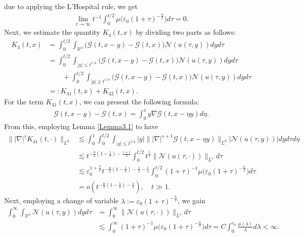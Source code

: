 \documentclass[11pt,reqno]{amsart}
\begin{document}
due to applying the L'Hospital rule, we get
\begin{align*}
    \lim_{t \to \infty} t^{-1} \int_0^{t/2} \mu\big(\varepsilon_0 (1+\tau)^{-\frac{n}{2}} \big) d\tau = 0.
\end{align*}
Next, we estimate the quantity $K_4(t,x)$ by dividing two parts as follows:
\begin{align*}
    K_4(t,x) &= \int_0^{t/2} \int_{\mathbb{R}^n} \big(\mathcal{G}(t, x-y)-\mathcal{G}(t,x)\big)\mathcal{N}(u(\tau,y)) dy d\tau \\
    &= \int_0^{t/2} \int_{|y| \leq t^{1/4}} \big(\mathcal{G}(t, x-y)-\mathcal{G}(t,x)\big)\mathcal{N}(u(\tau,y)) dy d\tau\\
    &\qquad + \int_0^{t/2} \int_{|y| \geq t^{1/4}} \big(\mathcal{G}(t, x-y)-\mathcal{G}(t,x)\big)\mathcal{N}(u(\tau,y)) dy d\tau\\
    & =: K_{41}(t,x) + K_{42}(t,x).
\end{align*}
For the term $K_{41}(t,x)$, we can present the following formula:
\begin{align*}
    \mathcal{G}(t, x-y) - \mathcal{G}(t,x) = \int_0^1 y\nabla \mathcal{G}(t,x-\eta y) d\eta.
\end{align*}
From this, employing Lemma \ref{Lemma3.1} to have
\begin{align*}
    \||\nabla|^s K_{41}(t,\cdot)\|_{L^\theta} &\lesssim \int_0^1\int_0^{t/2} \int_{|y| \leq t^{1/4}} |y|\||\nabla|^{s+1} \mathcal{G}(t, x-\eta y)\|_{L^\theta} |\mathcal{N}(u(\tau,y))| dy d\tau d\eta\\
    &\lesssim t^{-\frac{n}{2}(1-\frac{1}{\theta})-\frac{s+1}{2}} \int_0^{t/2} t^{\frac{1}{4}}\|\mathcal{N}(u(\tau,\cdot))\|_{L^1} d\tau\\
    &\lesssim \varepsilon_0^{1+\frac{2}{n}} t^{-\frac{n}{2}(1-\frac{1}{\theta})-\frac{s}{2}-\frac{1}{4}} \int_0^{t/2} (1+\tau)^{-1} \mu\big(\varepsilon_0 (1+\tau)^{-\frac{n}{2}}\big) d\tau \\
    &= o(t^{-\frac{n}{2}(1-\frac{1}{\theta})-\frac{s}{2}}), \quad t \gg 1.
\end{align*}
Next, employing a change of variable $\lambda := \varepsilon_0 (1+\tau)^{-\frac{n}{2}}$, we gain
\begin{align*}
    \int_0^{\infty}\int_{\mathbb{R}^n} \mathcal{N}(u(\tau,y))dy d\tau &= \int_0^{\infty} \|\mathcal{N}(u(\tau,\cdot))\|_{L^1} d\tau \\
    &\lesssim \int_0^{\infty} (1+\tau)^{-1} \mu\big(\varepsilon_0 (1+\tau)^{-\frac{n}{2}}\big) d\tau = C \int_0^{\varepsilon_0}\frac{\mu(\lambda)}{\lambda} d\lambda < \infty.
\end{align*}
\end{document}
